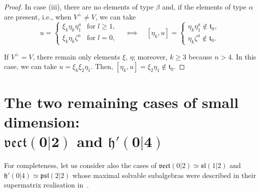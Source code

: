 \documentclass[pdftex]{sigma}
\newcommand {\fh} {{\mathfrak{h}}}
\newcommand {\fp} {{\mathfrak{p}}} %
\newcommand {\fsl} {{\mathfrak{sl}}}
\newcommand {\ft} {{\mathfrak{t}}}
\newcommand {\fvect} {{\mathfrak{vect}}} %
\newcommand {\<} [2] {{\left.\vphantom{#2}\right.^{#1\!}\!{#2}}}
\numberwithin{equation}{section}
\begin{document}
\begin{proof}
In case (iii), there are no elements of type $\beta$ and, if the elements of type $\alpha$ are present, i.e., when $V^\perp \ne V$, we can take
\[
u=\begin{cases}\xi_k\eta_k\eta_1^a&\text{for $l\ge 1$},\\
\xi_k\eta_k\zeta^a&\text{for $l=0$,}\end{cases}\quad \Longmapsto\quad  [\eta_k,u]=\begin{cases}\eta_k\eta_1^a\notin \ft_0,\\
\eta_k\zeta^a\notin \ft_0.\end{cases}
\]

If $V^\perp = V$, there remain only elements $\xi$, $\eta$; moreover, $k\ge 3$ because $n>4$. In this case, we can take $u=\xi_k\xi_2\eta_1$. Then, $[\eta_k,u]=\xi_2\eta_1\notin \ft_0$. \end{proof}

\section[The two remaining cases of small dimension: vect(0|2) and h'(0|4)]{The two remaining cases of small dimension:\\ $\boldsymbol{\fvect(0|2)}$ and $\boldsymbol{\fh'(0|4)}$}\label{ss5}

For completeness, let us consider also the cases of $\fvect(0|2)\simeq \fsl(1|2)$ and $\fh'(0|4)\simeq \fp\fsl(2|2)$ whose maximal solvable subalgebras were described in their supermatrix realisation in~\cite{S2}.
\end{document}

